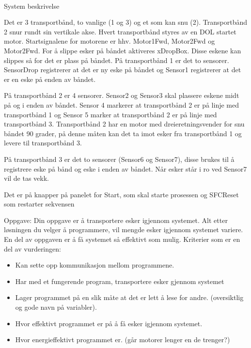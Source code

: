 

\\[0.2cm]
System beskrivelse

Det er 3 transportbånd, to vanlige (1 og 3) og et som kan snu (2). Transportbånd 2 snur rundt sin vertikale akse. Hvert transportbånd styres av en DOL startet motor. Startsignalene for motorene er hhv. Motor1Fwd, Motor2Fwd og Motor2Fwd. For å slippe esker på båndet aktiveres xDropBox. Disse eskene kan slippes så for det er plass på båndet. 
På transportbånd 1 er det to sensorer. SensorDrop registrerer at det er ny eske på båndet og Sensor1 registrerer at det er en eske på enden av båndet.
 
På transportbånd 2 er 4 sensorer. Sensor2 og Sensor3 skal plassere eskene midt på og i enden av båndet. Sensor 4 markerer at transportbånd 2 er på linje med transportbånd 1 og Sensor 5 marker at transportbånd 2 er på linje med transportbånd 3. Transportbånd 2 har en motor med dreieretningsvender for snu båndet 90 grader, på denne måten kan det ta imot esker fra transportbånd 1 og levere til transportbånd 3.
  
På transportbånd 3 er det to sensorer (Sensor6 og Sensor7), disse brukes til å registrere eske på bånd og eske i enden av båndet. Når esker står i ro ved Sensor7 vil de tas vekk. 

Det er på knapper på panelet for Start, som skal starte prosessen og SFCReset som restarter sekvensen 

Oppgave:
Din oppgave er å transportere esker igjennom systemet. Alt etter løsningen du velger å programmere, vil mengde esker igjennom systemet variere. En del av oppgaven er å få systemet så effektivt som mulig. 
Kriterier som er en del av vurderingen:
\begin{itemize}[noitemsep]
	\item Kan sette opp kommunikasjon mellom programmene. 
	\item Har med et fungerende program, transportere esker gjennom systemet
	\item Lager programmet på en slik måte at det er lett å lese for andre. (oversiktlig og gode navn på variabler). 
	\item Hvor effektivt programmet er på å få esker igjennom systemet. 
	\item Hvor energieffektivt programmet er. (går motorer lenger en de trenger?)
\end{itemize}

